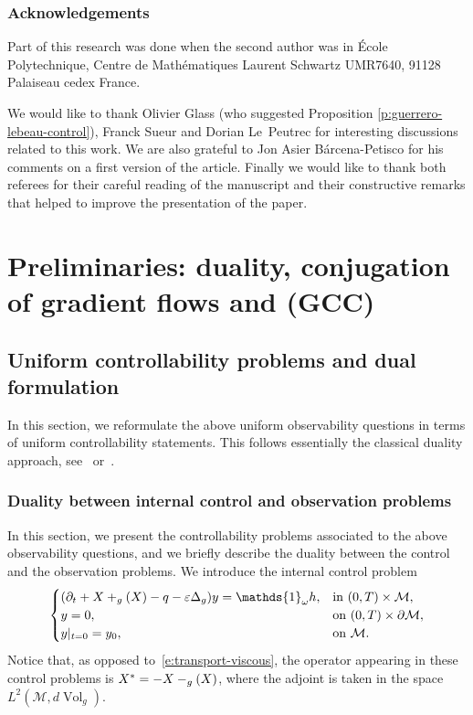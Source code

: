 \documentclass[JEP,XML,SOM,Unicode]{cedram}
\newcommand{\pGCC}{\textup{(GCC)}\xspace}
\theoremstyle{definition}
\newcommand{\M}{\ensuremath{\mathcal M}}
\DeclareMathOperator{\Vol}{Vol}
\let \div \relax
\DeclareMathOperator{\div}{div}
\let\d\partial
\let\eps\varepsilon
\let\q q
\begin{document}
\subsubsection*{Acknowledgements}
Part of this research was done when the second author was in École Polytechnique, Centre de Mathématiques Laurent Schwartz UMR7640, 91128 Palaiseau cedex France.

We would like to thank Olivier Glass (who suggested Proposition \ref{p:guerrero-lebeau-control}), Franck Sueur and Dorian Le~Peutrec for interesting discussions related to this work.
We are also grateful to Jon Asier Bárcena-Petisco for his comments on a first version of the article. Finally we would like to thank both referees for their careful reading of the manuscript and their constructive remarks that helped to improve the presentation of the paper.

\section{Preliminaries: duality, conjugation of gradient flows and \pGCC}
\label{s:preliminaires}

\subsection{Uniform controllability problems and dual formulation}

In this section, we reformulate the above uniform observability questions in terms of uniform controllability statements. This follows essentially the classical duality approach, see~\cite{DR:77} or~\cite[Chap.\,2.3]{Cor:book}.

\subsubsection{Duality between internal control and observation problems}
\label{s:obs-cont}
In this section, we present the controllability problems associated to the above observability questions, and we briefly describe the duality between the control and the observation problems.
We introduce the internal control problem
\begin{equation}
\label{e:transport-viscous-control-internal}
\begin{cases}
(\d_t + X + \div_g(X) -\q - \eps \Delta_g ) y = \mathds{1}_\omega h, & \text{in } (0,T)\times \M, \\
y = 0, & \text{on } (0,T)\times \d\M, \\
y|_{t=0} = y_0, & \text{on } \M.
\end{cases}
\end{equation}
Notice that, as opposed to~\eqref{e:transport-viscous}, the operator appearing in these control problems is $X^* = -X - \div_{g}(X)$, where the adjoint is taken in the space $L^2(\M, d\Vol_g)$.
\end{document}
